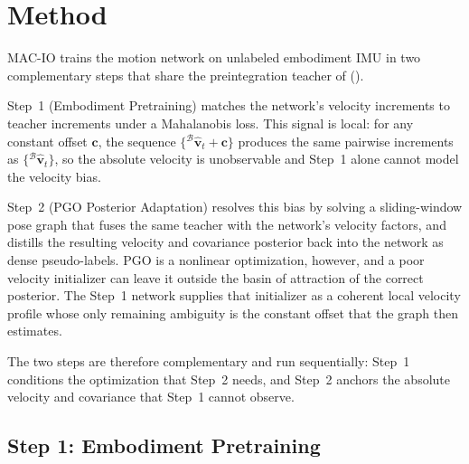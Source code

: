 \section{Method}
\label{sec:macio:method}

MAC-IO trains the motion network on unlabeled embodiment IMU in two complementary steps that share the preintegration teacher of  ().

Step~1 (Embodiment Pretraining) matches the network's velocity increments to teacher increments under a Mahalanobis loss.
This signal is local: for any constant offset $\mathbf{c}$, the sequence $\{{}^\mathcal{B}\hat{\mathbf{v}}_t+\mathbf{c}\}$ produces the same pairwise increments as $\{{}^\mathcal{B}\hat{\mathbf{v}}_t\}$, so the absolute velocity is unobservable and Step~1 alone cannot model the velocity bias.

Step~2 (PGO Posterior Adaptation) resolves this bias by solving a sliding-window pose graph that fuses the same teacher with the network's velocity factors, and distills the resulting velocity and covariance posterior back into the network as dense pseudo-labels.
PGO is a nonlinear optimization, however, and a poor velocity initializer can leave it outside the basin of attraction of the correct posterior.
The Step~1 network supplies that initializer as a coherent local velocity profile whose only remaining ambiguity is the constant offset that the graph then estimates.

The two steps are therefore complementary and run sequentially: Step~1 conditions the optimization that Step~2 needs, and Step~2 anchors the absolute velocity and covariance that Step~1 cannot observe.

\subsection{Step 1: Embodiment Pretraining}
\label{sec:macio:m1}

